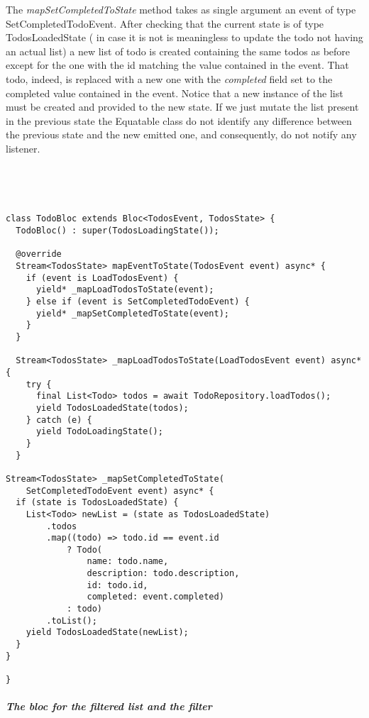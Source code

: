 The \textit{mapSetCompletedToState} method takes as single argument an event of type SetCompletedTodoEvent. After checking that the current state is of type TodosLoadedState ( in case it is not is meaningless to update the todo not having an actual list) a new list of todo is created containing the same todos as before except for the one with the id matching the value contained in the event. That todo, indeed, is replaced with a new one with the \textit{completed} field set to the completed value contained in the event. Notice that a new instance of the list must be created and provided to the new state. If we just mutate the list present in the previous state the Equatable class do not identify any difference between the previous state and the new emitted one, and consequently, do not notify any listener. 
\begin{code}
\mbox{}\\
 \mbox{}
\label{code:2.14}
\begin{verbatim}


class TodoBloc extends Bloc<TodosEvent, TodosState> {
  TodoBloc() : super(TodosLoadingState());

  @override
  Stream<TodosState> mapEventToState(TodosEvent event) async* {
    if (event is LoadTodosEvent) {
      yield* _mapLoadTodosToState(event);
    } else if (event is SetCompletedTodoEvent) {
      yield* _mapSetCompletedToState(event);
    } 
  }

  Stream<TodosState> _mapLoadTodosToState(LoadTodosEvent event) async* {
    try {
      final List<Todo> todos = await TodoRepository.loadTodos();
      yield TodosLoadedState(todos);
    } catch (e) {
      yield TodoLoadingState();
    }
  }

Stream<TodosState> _mapSetCompletedToState(
    SetCompletedTodoEvent event) async* {
  if (state is TodosLoadedState) {
    List<Todo> newList = (state as TodosLoadedState)
        .todos
        .map((todo) => todo.id == event.id
            ? Todo(
                name: todo.name,
                description: todo.description,
                id: todo.id,
                completed: event.completed)
            : todo)
        .toList();
    yield TodosLoadedState(newList);
  }
}

}
\end{verbatim}
\mbox{}
\end{code}

\subparagraph{The bloc for the filtered list and the filter}\mbox{}\\
\label{subpar:todo_app_bloc_core_state}


